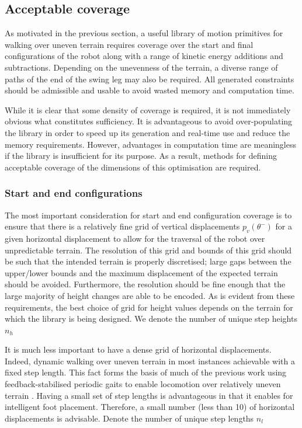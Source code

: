 \subsection{Acceptable coverage}
As motivated in the previous section, a useful library of motion primitives for walking over uneven terrain requires coverage over the start and final configurations of the robot along with a range of kinetic energy additions and subtractions. Depending on the unevenness of the terrain, a diverse range of paths of the end of the swing leg may also be required. All generated constraints should be admissible and usable to avoid wasted memory and computation time.

While it is clear that some density of coverage is required, it is not immediately obvious what constitutes sufficiency. It is advantageous to avoid over-populating the library in order to speed up its generation and real-time use and reduce the memory requirements. However, advantages in computation time are meaningless if the library is insufficient for its purpose. As a result, methods for defining acceptable coverage of the dimensions of this optimisation are required.

\subsubsection{Start and end configurations}
The most important consideration for start and end configuration coverage is to ensure that there is a relatively fine grid of vertical displacements $p_v(\theta^-)$ for a given horizontal displacement to allow for the traversal of the robot over unpredictable terrain. The resolution of this grid and bounds of this grid should be such that the intended terrain is properly discretised; large gaps between the upper/lower bounds and the maximum displacement of the expected terrain should be avoided. Furthermore, the resolution should be fine enough that the large majority of height changes are able to be encoded. As is evident from these requirements, the best choice of grid for height values depends on the terrain for which the library is being designed. We denote the number of unique step heights $n_h$

It is much less important to have a dense grid of horizontal displacements. Indeed, dynamic walking over uneven terrain in most instances achievable with a fixed step length. This fact forms the basis of much of the previous work using feedback-stabilised periodic gaits to enable locomotion over relatively uneven terrain \cite{bigdog?}. Having a small set of step lengths is advantageous in that it enables for intelligent foot placement. Therefore, a small number (less than 10) of horizontal displacements is advisable. Denote the number of unique step lengths $n_l$

